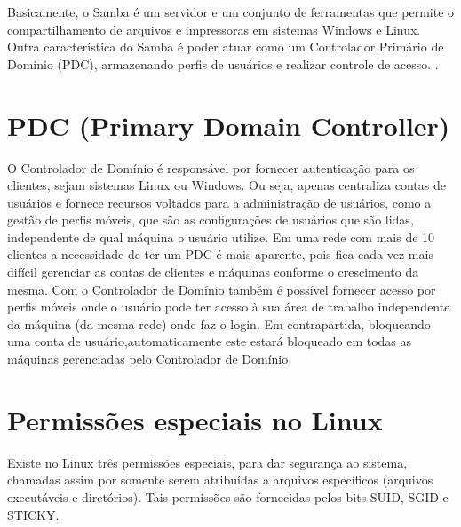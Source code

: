 Basicamente, o Samba é um servidor e um conjunto de ferramentas que permite o compartilhamento de arquivos e impressoras em sistemas Windows e Linux. Outra característica do Samba é poder atuar como um Controlador Primário de Domínio (PDC), armazenando perfis de usuários e realizar controle de acesso. \cite{FOCA}.

\section{PDC (Primary Domain Controller)}

O Controlador de Domínio é responsável por fornecer autenticação para os clientes, sejam sistemas Linux ou Windows. Ou seja, apenas centraliza contas de usuários e fornece recursos voltados para a administração de usuários, como a gestão de perfis móveis, que são as configurações de usuários que são lidas, independente de qual máquina o usuário utilize. Em uma rede com mais de 10 clientes a necessidade de ter um PDC é mais aparente, pois fica cada vez mais difícil gerenciar as contas de clientes e máquinas conforme o crescimento da mesma. Com o Controlador de Domínio também é possível fornecer acesso por perfis móveis onde o usuário pode ter acesso à sua área de trabalho independente da máquina (da mesma rede) onde faz o login. Em contrapartida, bloqueando uma conta de usuário,automaticamente este estará bloqueado em todas as máquinas gerenciadas pelo Controlador de Domínio \cite{MORIMOTO}

\section{Permissões especiais no Linux}

Existe no Linux três permissões especiais, para dar segurança ao sistema, chamadas assim por somente serem atribuídas a arquivos específicos (arquivos executáveis e diretórios). Tais permissões são fornecidas pelos bits SUID, SGID e STICKY.


